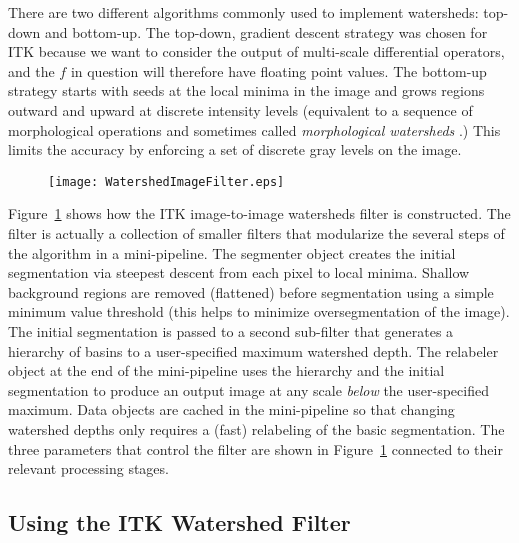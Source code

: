 There are two different algorithms commonly used to implement watersheds:
top-down and bottom-up.  The top-down, gradient descent strategy was chosen for
ITK because we want to consider the output of multi-scale differential
operators, and the $f$ in question will therefore have floating point
values. The bottom-up strategy starts with seeds at the local minima in the
image and grows regions outward and upward at discrete intensity levels
(equivalent to a sequence of morphological operations and sometimes called {\em
morphological watersheds} \cite{Serra1982}.) This limits the accuracy by
enforcing a set of discrete gray levels on the image.

\begin{figure}
\centering
\texttt{[image: WatershedImageFilter.eps]}
\protect\label{fig:constructionWatersheds}
\end{figure}

Figure~\ref{fig:constructionWatersheds} shows how the ITK image-to-image
watersheds filter is constructed.  The filter is actually a collection of
smaller filters that modularize the several steps of the algorithm in a
mini-pipeline.  The segmenter object creates the initial segmentation via
steepest descent from each pixel to local minima. Shallow background regions
are removed (flattened) before segmentation using a simple minimum value
threshold (this helps to minimize oversegmentation of the image).  The
initial segmentation is passed to a second sub-filter that generates a
hierarchy of basins to a user-specified maximum watershed depth.  The
relabeler object at the end of the mini-pipeline uses the hierarchy and the
initial segmentation to produce an output image at any scale {\em below} the
user-specified maximum.  Data objects are cached in the mini-pipeline so that
changing watershed depths only requires a (fast) relabeling of the basic
segmentation.  The three parameters that control the filter are shown in
Figure~\ref{fig:constructionWatersheds} connected to their relevant
processing stages.

\subsection{Using the ITK Watershed Filter}
\label{sec:UsingWatersheds}



